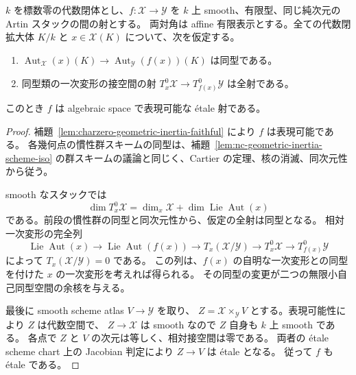 \begin{lemma}
\label{lem:smooth-stack-etale-tangent-comparison}
$k$ を標数零の代数閉体とし、$f:\mathcal X\to\mathcal Y$ を
$k$ 上 smooth、有限型、同じ純次元の Artin スタックの間の射とする。
両対角は affine 有限表示とする。全ての代数閉拡大体 $K/k$ と
$x\in\mathcal X(K)$ について、次を仮定する。
\begin{enumerate}
\item $\operatorname{Aut}_{\mathcal X}(x)(K)\to
  \operatorname{Aut}_{\mathcal Y}(f(x))(K)$ は同型である。
\item 同型類の一次変形の接空間の射
  $T^0_x\mathcal X\to T^0_{f(x)}\mathcal Y$ は全射である。
\end{enumerate}
このとき $f$ は algebraic space で表現可能な \texorpdfstring{\'etale}{etale} 射である。
\end{lemma}
\begin{proof}
補題~\ref{lem:charzero-geometric-inertia-faithful} により $f$ は表現可能である。
各幾何点の慣性群スキームの同型は、補題~\ref{lem:nc-geometric-inertia-scheme-iso}
の群スキームの議論と同じく、Cartier の定理、核の消滅、同次元性から従う。

smooth なスタックでは
\[
 \dim T^0_x\mathcal X
  =\dim_x\mathcal X+\dim\operatorname{Lie}\operatorname{Aut}(x)
\]
である。前段の慣性群の同型と同次元性から、仮定の全射は同型となる。
相対一次変形の完全列
\[
 \operatorname{Lie}\operatorname{Aut}(x)
 \longrightarrow\operatorname{Lie}\operatorname{Aut}(f(x))
 \longrightarrow T_x(\mathcal X/\mathcal Y)
 \longrightarrow T^0_x\mathcal X
 \longrightarrow T^0_{f(x)}\mathcal Y
\]
によって $T_x(\mathcal X/\mathcal Y)=0$ である。
この列は、$f(x)$ の自明な一次変形との同型を付けた $x$ の一次変形を考えれば得られる。
その同型の変更が二つの無限小自己同型空間の余核を与える。

最後に smooth scheme atlas $V\to\mathcal Y$ を取り、
$Z=\mathcal X\times_{\mathcal Y}V$ とする。表現可能性により $Z$ は代数空間で、
$Z\to\mathcal X$ は smooth なので $Z$ 自身も $k$ 上 smooth である。
各点で $Z$ と $V$ の次元は等しく、相対接空間は零である。
両者の \texorpdfstring{\'etale}{etale} scheme chart 上の Jacobian 判定により
$Z\to V$ は \texorpdfstring{\'etale}{etale} となる。
従って $f$ も \texorpdfstring{\'etale}{etale} である。
\end{proof}

